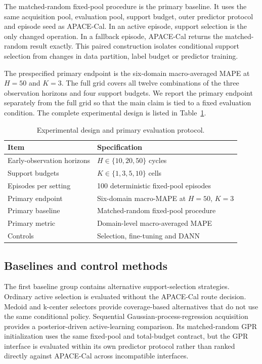 \documentclass[preprint,12pt]{elsarticle}
\begin{document}
The matched-random fixed-pool procedure is the primary baseline. It uses the same acquisition pool, evaluation pool, support budget, outer predictor protocol and episode seed as APACE-Cal. In an active episode, support selection is the only changed operation. In a fallback episode, APACE-Cal returns the matched-random result exactly. This paired construction isolates conditional support selection from changes in data partition, label budget or predictor training.

The prespecified primary endpoint is the six-domain macro-averaged MAPE at $H=50$ and $K=3$. The full grid covers all twelve combinations of the three observation horizons and four support budgets. We report the primary endpoint separately from the full grid so that the main claim is tied to a fixed evaluation condition. The complete experimental design is listed in Table~\ref{tab:design}.

\begin{table}[t]
\centering
\caption{Experimental design and primary evaluation protocol.}
\label{tab:design}
\begin{tabular}{ll}
\toprule
\textbf{Item} & \textbf{Specification} \\
\midrule
Early-observation horizons & $H\in\{10,20,50\}$ cycles \\
Support budgets & $K\in\{1,3,5,10\}$ cells \\
Episodes per setting & 100 deterministic fixed-pool episodes \\
Primary endpoint & Six-domain macro-MAPE at $H=50$, $K=3$ \\
Primary baseline & Matched-random fixed-pool procedure \\
Primary metric & Domain-level macro-averaged MAPE \\
Controls & Selection, fine-tuning and DANN \\
\bottomrule
\end{tabular}
\end{table}

\subsection{Baselines and control methods}

The first baseline group contains alternative support-selection strategies. Ordinary active selection is evaluated without the APACE-Cal route decision. Medoid and k-center selectors provide coverage-based alternatives that do not use the same conditional policy. Sequential Gaussian-process-regression acquisition provides a posterior-driven active-learning comparison. Its matched-random GPR initialization uses the same fixed-pool and total-budget contract, but the GPR interface is evaluated within its own predictor protocol rather than ranked directly against APACE-Cal across incompatible interfaces.
\end{document}
